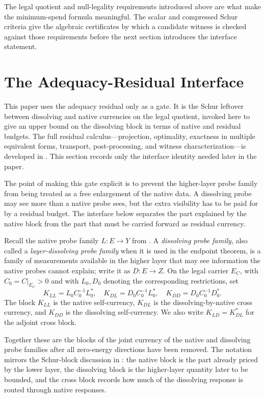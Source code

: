 \documentclass[11pt]{article}
\theoremstyle{definition}
\begin{document}
The legal quotient and null-legality requirements introduced above
are what make the minimum-spend formula meaningful.  The scalar and
compressed Schur criteria give the algebraic certificates by which a
candidate witness is checked against those requirements before the
next section introduces the interface statement.

 

\section{The Adequacy-Residual Interface}
\label{sec:xi-interface}

This paper uses the adequacy residual only as a gate.  It is the Schur
leftover between dissolving and native currencies on the legal quotient,
invoked here to give an upper bound on the dissolving block in terms
of native and residual budgets.  The full residual calculus---projection, optimality,
exactness in multiple equivalent forms, transport, post-processing, and
witness characterization---is developed in
\citet{Tsiokos2026XiCompanion}.  This section records only the interface
identity needed later in the paper.

The point of making this gate explicit is to prevent the higher-layer
probe family from being treated as a free enlargement of the native
data.  A dissolving probe may see more than a native probe sees, but the
extra visibility has to be paid for by a residual budget.  The interface
below separates the part explained by the native block from the part
that must be carried forward as residual currency.

Recall the native probe family \(L:E\to Y\) from
.  A \emph{dissolving probe family}, also called a
\emph{layer-dissolving probe family} when it is used in the endpoint
theorem, is a family of measurements available in the higher layer that
may see information the native probes cannot explain; write it as
\(D:E\to Z\).  On the legal carrier \(E_C\), with
\(C_0=C|_{E_C}>0\) and with \(L_0,D_0\) denoting the corresponding
restrictions, set
\[
  K_{LL}=L_0C_0^{-1}L_0^*,\quad
  K_{DL}=D_0C_0^{-1}L_0^*,\quad
  K_{DD}=D_0C_0^{-1}D_0^*.
\]
The block \(K_{LL}\) is the native self-currency, \(K_{DL}\) is the
dissolving-by-native cross currency, and \(K_{DD}\) is the dissolving
self-currency.  We also write \(K_{LD}=K_{DL}^*\) for the adjoint cross
block.

Together these are the blocks of the joint currency of the native and
dissolving probe families after all zero-energy directions have been
removed.  The notation mirrors the Schur-block discussion in
: the native block is the part already priced by the
lower layer, the dissolving block is the higher-layer quantity later to
be bounded, and the cross block records how much of the dissolving
response is routed through native responses.
\end{document}

